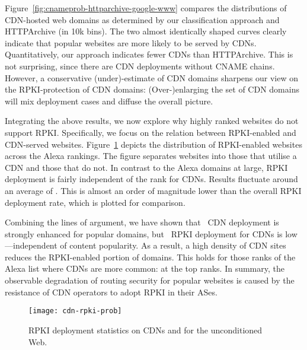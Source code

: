 Figure~\ref{fig:cnameprob-httparchive-google-www} compares the distributions of 
CDN-hosted web domains as determined by our classification approach and  
HTTPArchive (in 10k bins). The two almost identically shaped curves clearly
indicate that popular websites are more likely to be served by CDNs. 
Quantitatively, our approach indicates fewer CDNs than HTTPArchive. This is not surprising, since there are CDN deployments without CNAME chains. However, a conservative (un\-der)-estimate of CDN domains sharpens our view on the RPKI-protection of CDN domains: (Over-)en\-larg\-ing the set of CDN domains will mix deployment cases and diffuse the overall picture.

Integrating the above results, we now explore why highly ranked websites do not support RPKI. Specifically, we focus on the relation between RPKI-enabled and CDN-served websites.
Figure~\ref{fig:rpki-cdn-prob} depicts the distribution of RPKI-enabled websites across the Alexa rankings. The figure separates websites into those that utilise a CDN and those that do not.
In contrast to the Alexa domains at large, RPKI deployment is fairly independent of the rank for CDNs. Results fluctuate around an average of . This is almost an order of magnitude lower than the overall RPKI deployment rate, which is plotted for comparison.


Combining the lines of argument, we have shown that \one~CDN deployment is strongly enhanced for popular domains, but \two~RPKI deployment for CDNs is low---independent of content popularity. As a result, a high density of CDN sites reduces the RPKI-enabled portion of domains.
This holds for those ranks of the Alexa list where CDNs are more common: at the top ranks.
In summary, the observable degradation of routing security for popular websites is caused by the resistance of CDN operators to adopt RPKI in their ASes.




\begin{figure}
  \texttt{[image: cdn-rpki-prob]}
  \caption{RPKI deployment statistics on CDNs and for the unconditioned Web.}
  \label{fig:rpki-cdn-prob}
\end{figure}

